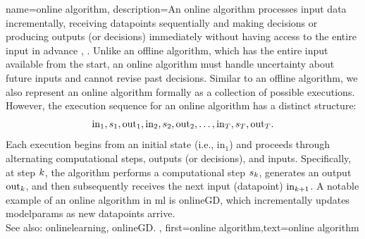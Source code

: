 {name={online algorithm},
	description={An online \gls{algorithm} processes input \gls{data} incrementally, 
		receiving \gls{datapoint}s sequentially and making decisions or producing outputs (or decisions) immediately 
		without having access to the entire input in advance \cite{PredictionLearningGames}, \cite{HazanOCO}. 
		Unlike an offline \gls{algorithm}, which has the entire input available from the start, an online \gls{algorithm} 
		must handle \gls{uncertainty} about future inputs and cannot revise past decisions. Similar to an 
		offline \gls{algorithm}, we also represent an online \gls{algorithm} formally as a collection of possible 
		executions. However, the execution sequence for an online \gls{algorithm} has a distinct structure:
		$${\rm in}_{1},s_1,{\rm out}_{1},{\rm in}_{2},s_2,{\rm out}_{2},\ldots,{\rm in}_{T},s_T,{\rm out}_{T}.$$ 
		Each execution begins from an initial state (i.e., \(\text{in}_{1}\)) and proceeds through alternating 
		computational steps, outputs (or decisions), and inputs. Specifically, at step \(k\), 
		the \gls{algorithm} performs a computational step \(s_{k}\), generates an output \(\text{out}_{k}\), 
		and then subsequently receives the next input (\gls{datapoint}) \(\text{in}_{k+1}\). A 
		notable example of an online \gls{algorithm} in \gls{ml} is \gls{onlineGD}, which incrementally 
		updates \gls{modelparams} as new \gls{datapoint}s arrive. 
		\\ See also: \gls{onlinelearning}, \gls{onlineGD}.
	},
	first={online algorithm},text={online algorithm} 
}

